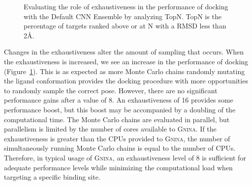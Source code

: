 \documentclass[linenumbers,doublespacing]{bmcart}
\begin{document}
\begin{figure}[tb]  
	\caption{Evaluating the role of exhaustiveness in the performance of docking with the Default CNN Ensemble by analyzing TopN. TopN is the percentage of targets ranked above or at N with a RMSD less than 2{\AA}.}
	\label{fig:exhaustiveness}
\end{figure}    

Changes in the exhaustiveness alter the amount of sampling that occurs. When the exhaustiveness is increased, we see an increase in the performance of docking (Figure~\ref{fig:exhaustiveness}). This is as expected as more Monte Carlo chains randomly mutating the ligand conformation provides the docking procedure with more opportunities to randomly sample the correct pose. However, there are no significant performance gains after a value of 8. An exhaustiveness of 16 provides some performance boost, but this boost may be accompanied by a doubling of the computational time. The Monte Carlo chains are evaluated in parallel, but parallelism is limited by the number of cores available to \textsc{Gnina}. If the exhaustiveness is greater than the CPUs provided to \textsc{Gnina}, the number of simultaneously running Monte Carlo chains is equal to the number of CPUs. Therefore, in typical usage of \textsc{Gnina}, an exhaustiveness level of 8 is sufficient for adequate performance levels while minimizing the computational load when targeting a specific binding site. 
\end{document}
